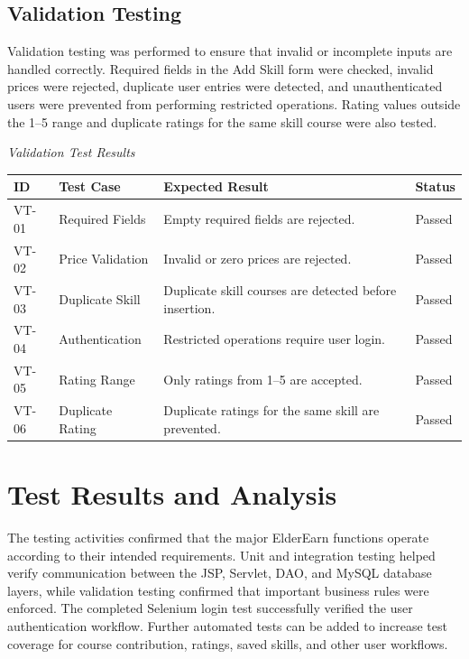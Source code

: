 \documentclass[12pt,a4paper]{report}
\begin{document}
\subsection{Validation Testing}
Validation testing was performed to ensure that invalid or incomplete inputs are handled correctly. Required fields in the Add Skill form were checked, invalid prices were rejected, duplicate user entries were detected, and unauthenticated users were prevented from performing restricted operations. Rating values outside the 1--5 range and duplicate ratings for the same skill course were also tested.

\vspace{0.3cm}
\noindent\textit{Validation Test Results}
\vspace{0.2cm}

\begin{table}[H]
\centering
\small
\begin{tabularx}{\textwidth}{|L{1.8cm}|L{3.8cm}|L{5.0cm}|L{2.0cm}|}
\hline
\textbf{ID} & \textbf{Test Case} & \textbf{Expected Result} & \textbf{Status} \\ \hline
VT-01 & Required Fields & Empty required fields are rejected. & Passed \\ \hline
VT-02 & Price Validation & Invalid or zero prices are rejected. & Passed \\ \hline
VT-03 & Duplicate Skill & Duplicate skill courses are detected before insertion. & Passed \\ \hline
VT-04 & Authentication & Restricted operations require user login. & Passed \\ \hline
VT-05 & Rating Range & Only ratings from 1--5 are accepted. & Passed \\ \hline
VT-06 & Duplicate Rating & Duplicate ratings for the same skill are prevented. & Passed \\ \hline
\end{tabularx}
\end{table}

\section{Test Results and Analysis}
The testing activities confirmed that the major ElderEarn functions operate according to their intended requirements. Unit and integration testing helped verify communication between the JSP, Servlet, DAO, and MySQL database layers, while validation testing confirmed that important business rules were enforced. The completed Selenium login test successfully verified the user authentication workflow. Further automated tests can be added to increase test coverage for course contribution, ratings, saved skills, and other user workflows.
\end{document}
